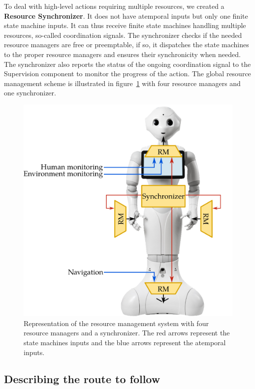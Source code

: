 To deal with high-level actions requiring multiple resources, we created a \textbf{Resource Synchronizer}. It does not have atemporal inputs but only one finite state machine inputs. It can thus receive finite state machines handling multiple resources, so-called coordination signals. The synchronizer checks if the needed resource managers are free or preemptable, if so, it dispatches the state machines to the proper resource managers and ensures their synchronicity when needed. The synchronizer also reports the status of the ongoing coordination signal to the Supervision component to monitor the progress of the action.
The global resource management scheme is illustrated in figure~\ref{fig:chap8_rm} with four resource managers and one synchronizer.

\begin{figure}[!hb]
\centering
\includegraphics[scale=0.26]{figures/chapter8/rm.png}
\caption{\label{fig:chap8_rm} Representation of the resource management system with four resource managers and a synchronizer. The red arrows represent the state machines inputs and the blue arrows represent the atemporal inputs.}
\end{figure}

\subsection{Describing the route to follow}

